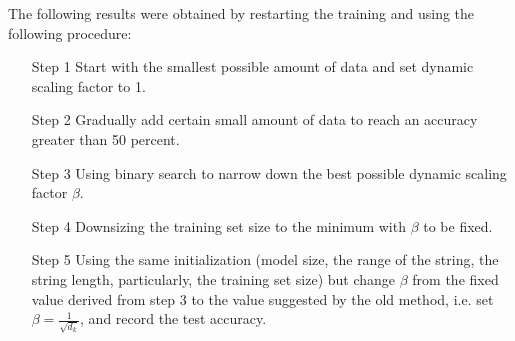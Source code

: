 \documentclass{article}
\theoremstyle{plain}
\theoremstyle{plain} %
\theoremstyle{definition}  %
\theoremstyle{remark}  %
\theoremstyle{plain}
\begin{document}
The following results were obtained by restarting the training and using the following procedure:
\begin{itemize}
\item[Step 1] Start with the smallest possible amount of data and set dynamic scaling factor to 1.
\item[Step 2] Gradually add certain small amount of data to reach an accuracy greater than 50 percent.
\item[Step 3] Using binary search to narrow down the best possible dynamic scaling factor $\beta$.
\item[Step 4] Downsizing the training set size to the minimum with $\beta$ to be fixed.
\item[Step 5] Using the same initialization (model size, the range of the string, the string length, particularly, the training set size) but change $\beta$ from the fixed value derived from step 3 to the value suggested by the old method\cite{vaswani2017attention}, i.e. set $\beta=\frac{1}{\sqrt{d_k}}$, and record the test accuracy.
\end{itemize}
\end{document}
